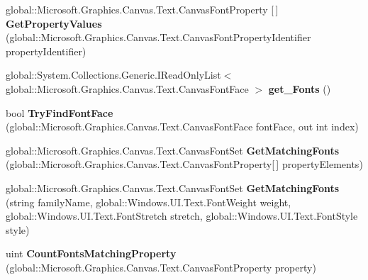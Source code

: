 \begin{DoxyCompactItemize}
global\+::\+Microsoft.\+Graphics.\+Canvas.\+Text.\+Canvas\+Font\+Property \mbox{[}$\,$\mbox{]} {\bfseries Get\+Property\+Values} (global\+::\+Microsoft.\+Graphics.\+Canvas.\+Text.\+Canvas\+Font\+Property\+Identifier property\+Identifier)
\item 
\mbox{\label{interface_microsoft_1_1_graphics_1_1_canvas_1_1_text_1_1_i_canvas_font_set_a3127f9ceaa2e85c1d6dc30f5eae2eb02}} 
global\+::\+System.\+Collections.\+Generic.\+I\+Read\+Only\+List$<$ global\+::\+Microsoft.\+Graphics.\+Canvas.\+Text.\+Canvas\+Font\+Face $>$ {\bfseries get\+\_\+\+Fonts} ()
\item 
\mbox{\label{interface_microsoft_1_1_graphics_1_1_canvas_1_1_text_1_1_i_canvas_font_set_aa2c30125a6ebce4c37256a8c0277ff6a}} 
bool {\bfseries Try\+Find\+Font\+Face} (global\+::\+Microsoft.\+Graphics.\+Canvas.\+Text.\+Canvas\+Font\+Face font\+Face, out int index)
\item 
\mbox{\label{interface_microsoft_1_1_graphics_1_1_canvas_1_1_text_1_1_i_canvas_font_set_a32b02ae8a2da14f8f1cfa1cc5d6002b3}} 
global\+::\+Microsoft.\+Graphics.\+Canvas.\+Text.\+Canvas\+Font\+Set {\bfseries Get\+Matching\+Fonts} (global\+::\+Microsoft.\+Graphics.\+Canvas.\+Text.\+Canvas\+Font\+Property\mbox{[}$\,$\mbox{]} property\+Elements)
\item 
\mbox{\label{interface_microsoft_1_1_graphics_1_1_canvas_1_1_text_1_1_i_canvas_font_set_ade4753638611bbb574a4ebc50e68e70e}} 
global\+::\+Microsoft.\+Graphics.\+Canvas.\+Text.\+Canvas\+Font\+Set {\bfseries Get\+Matching\+Fonts} (string family\+Name, global\+::\+Windows.\+U\+I.\+Text.\+Font\+Weight weight, global\+::\+Windows.\+U\+I.\+Text.\+Font\+Stretch stretch, global\+::\+Windows.\+U\+I.\+Text.\+Font\+Style style)
\item 
\mbox{\label{interface_microsoft_1_1_graphics_1_1_canvas_1_1_text_1_1_i_canvas_font_set_a1def5cacbe2bad80bc122419229c2640}} 
uint {\bfseries Count\+Fonts\+Matching\+Property} (global\+::\+Microsoft.\+Graphics.\+Canvas.\+Text.\+Canvas\+Font\+Property property)

\end{DoxyCompactItemize}

